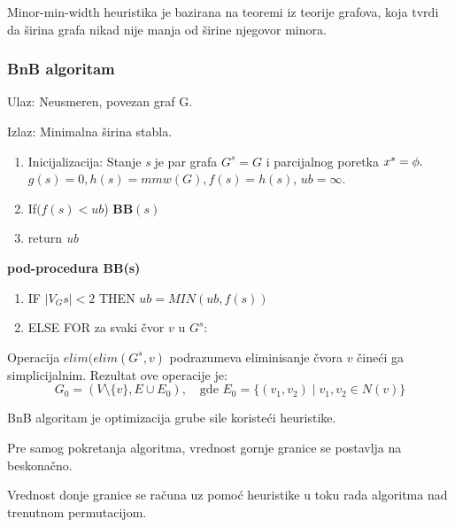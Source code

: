 \documentclass[10pt]{article}
\begin{document}
Minor-min-width heuristika je bazirana na teoremi iz teorije grafova, koja tvrdi da širina grafa nikad nije manja od širine njegovor minora.
\subsubsection{BnB algoritam}

Ulaz: Neusmeren, povezan graf G.

Izlaz: Minimalna širina stabla.

\begin{enumerate}
    \item Inicijalizacija: Stanje \textit{s} je par grafa $G^s = G$ i parcijalnog poretka $x^s = \phi.\\$$g(s) = 0, h(s) = mmw(G), f(s) = h(s)$, $ub = \infty$.
    \item If$(f(s) < ub$) \textbf{BB}$(s)$
    \item return \textit{ub}
\end{enumerate}

\textbf{pod-procedura BB(s)}
\begin{enumerate}
    \item IF $|V_Gs|<2$ THEN $ub = MIN(ub, f(s))$
    \item ELSE FOR za svaki čvor $v$ u $G^s$:
    \begin{enumerate}
    \item Napravi stanje $s' = ({G^s^'}, {x^s^'})$ gde je\\ ${G^s^'} = elim({G^s}, v)$ i  ${x^s^'} = (x^s, v).$
    \item $g({s^'}) = MAX(g(s), degree_{G^s}(v))$
    \item $h({s^'}) =$ \textbf{minor-min-width}($G^s^'})$
    \item $f({s^'}) = MAX(g({s^'}), h({s^'}))$
    \item If $f({s^'}) < ub$ onda $BB({s^'})$
    \end{enumerate}
\end{enumerate}

Operacija $elim(elim({G^s}, v)$ podrazumeva eliminisanje čvora $v$ čineći ga simplicijalnim. Rezultat ove operacije je:
\[
G_0 = (V \setminus \{v\}, E \cup E_0), \quad \text{gde } E_0 = \{(v_1, v_2) \mid v_1, v_2 \in N(v)\}
\]

BnB algoritam je optimizacija grube sile koristeći heuristike.

Pre samog pokretanja algoritma, vrednost gornje granice se postavlja na beskonačno.

Vrednost donje granice se računa uz pomoć heuristike u toku rada algoritma nad trenutnom permutacijom.
\end{document}
